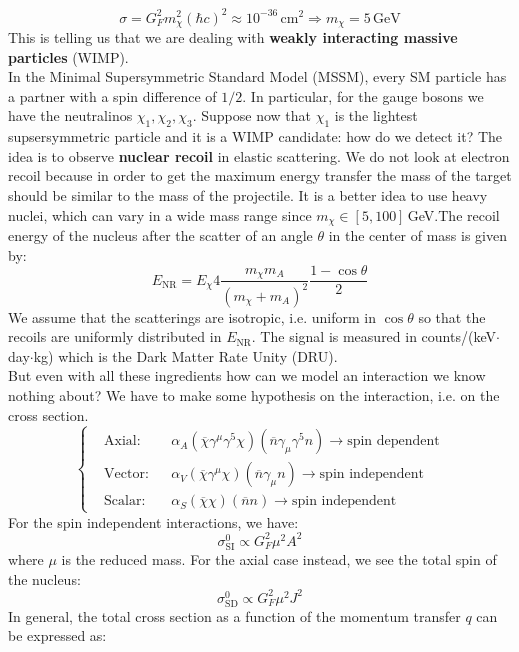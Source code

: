 \documentclass[10.75pt,a4paper,openright,bottom=2cm]{article}
\begin{document}
\[
\sigma=G_F^2m_\chi^2(\hbar c)^2\approx10^{-36}\,\text{cm$^2$} \Rightarrow m_\chi=5\,\text{GeV}
\]
This is telling us that we are dealing with \textbf{weakly interacting massive particles} (WIMP).\\
In the Minimal Supersymmetric Standard Model (MSSM), every SM particle has a partner with a spin difference of $1/2$. In particular, for the gauge bosons we have the neutralinos $\chi_1, \chi_2, \chi_3$. Suppose now that $\chi_1$ is the lightest supsersymmetric particle and it is a WIMP candidate: how do we detect it? The idea is to observe \textbf{nuclear recoil} in elastic scattering. We do not look at electron recoil because in order to get the maximum energy transfer the mass of the target should be similar to the mass of the projectile. It is a better idea to use heavy nuclei, which can vary in a wide mass range since $m_\chi\in[5,100]$\,GeV.The recoil energy of the nucleus after the scatter of an angle $\theta$ in the center of mass is given by:
\[
E_{\text{NR}}=E_\chi 4\frac{m_\chi m_A}{(m_\chi+m_A)^2}\frac{1-\cos\theta}{2}
\]
We assume that the scatterings are isotropic, i.e. uniform in $\cos\theta$ so that the recoils are uniformly distributed in $E_{\text{NR}}$. The signal is measured in counts/(keV$\cdot$day$\cdot$kg) which is the Dark Matter Rate Unity (DRU).\\
But even with all these ingredients how can we model an interaction we know nothing about? We have to make some hypothesis on the interaction, i.e. on the cross section.
\[
\left\{
\begin{aligned}
&\text{Axial:}&&\alpha_A(\overline{\chi}\gamma^\mu\gamma^5\chi)(\overline{n}\gamma_\mu\gamma^5n)\to\text{spin dependent}\\
&\text{Vector:}&&\alpha_V(\overline{\chi}\gamma^\mu\chi)(\overline{n}\gamma_\mu n)\to\text{spin independent}\\
&\text{Scalar:}&&\alpha_S(\overline{\chi}\chi)(\overline{n}n)\to\text{spin independent}
\end{aligned}
\right.
\]
For the spin independent interactions, we have:
\[
\sigma_{\text{SI}}^0\propto G_F^2\mu^2A^2
\]
where $\mu$ is the reduced mass. For the axial case instead, we see the total spin of the nucleus:
\[
\sigma_{\text{SD}}^0\propto G_F^2\mu^2J^2
\]
In general, the total cross section as a function of the momentum transfer $q$ can be expressed as:
\end{document}
